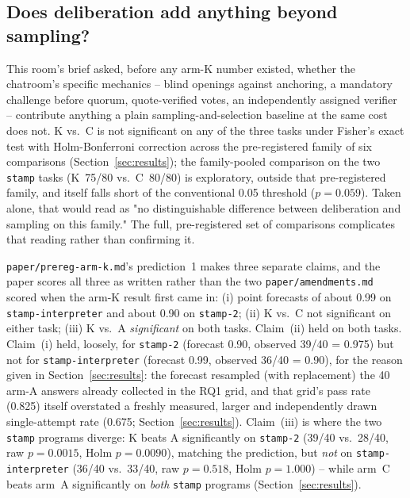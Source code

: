 \subsection{Does deliberation add anything beyond sampling?}
\label{sec:discussion-beyond-sampling}

This room's brief asked, before any arm-K number existed, whether the chatroom's specific mechanics --
blind openings against anchoring, a mandatory challenge before quorum, quote-verified votes, an
independently assigned verifier -- contribute anything a plain sampling-and-selection baseline at the
same cost does not. K vs.\ C is not significant on any of the three tasks under Fisher's exact test with
Holm-Bonferroni correction across the pre-registered family of six comparisons
(Section~\ref{sec:results}); the family-pooled comparison on the two \texttt{stamp} tasks (K~75/80 vs.\
C~80/80) is exploratory, outside that pre-registered family, and itself falls short of the conventional
0.05 threshold ($p=0.059$). Taken alone, that would read as "no distinguishable difference between
deliberation and sampling on this family." The full, pre-registered set of comparisons complicates that
reading rather than confirming it.

\texttt{paper/prereg-arm-k.md}'s prediction~1 makes three separate claims, and the paper scores all
three as written rather than the two \texttt{paper/amendments.md} scored when the arm-K result first
came in: (i) point forecasts of about 0.99 on \texttt{stamp-interpreter} and about 0.90 on
\texttt{stamp-2}; (ii) K vs.\ C not significant on either task; (iii) K vs.\ A \emph{significant} on
both tasks. Claim~(ii) held on both tasks. Claim~(i) held, loosely, for \texttt{stamp-2} (forecast 0.90,
observed 39/40 = 0.975) but not for \texttt{stamp-interpreter} (forecast 0.99, observed 36/40 = 0.90),
for the reason given in Section~\ref{sec:results}: the forecast resampled (with replacement) the 40
arm-A answers already collected in the RQ1 grid, and that grid's pass rate (0.825) itself overstated a
freshly measured, larger and independently drawn single-attempt rate (0.675; Section~\ref{sec:results}).
Claim~(iii) is where the two \texttt{stamp}
programs diverge: K beats A significantly on \texttt{stamp-2} (39/40 vs.\ 28/40, raw $p=0.0015$, Holm
$p=0.0090$), matching the prediction, but \emph{not} on \texttt{stamp-interpreter} (36/40 vs.\ 33/40,
raw $p=0.518$, Holm $p=1.000$) -- while arm~C beats arm~A significantly on \emph{both}
\texttt{stamp} programs (Section~\ref{sec:results}).

